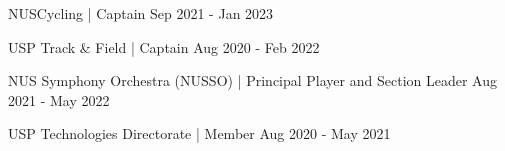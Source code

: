 

\begin{cvhonors}

  \cvhonor
    {NUSCycling} %
    {| Captain} %
    {} %
    {Sep 2021 - Jan 2023} %

  \cvhonor
    {USP Track \& Field} %
    {| Captain} %
    {} %
    {Aug 2020 - Feb 2022} %

  \cvhonor
    {NUS Symphony Orchestra (NUSSO)} %
    {| Principal Player and Section Leader} %
    {} %
    {Aug 2021 - May 2022} %

  \cvhonor
    {USP Technologies Directorate} %
    {| Member} %
    {} %
    {Aug 2020 - May 2021} %

\end{cvhonors}
